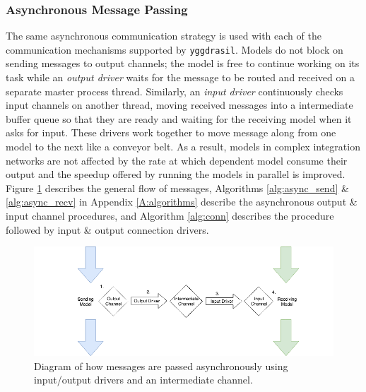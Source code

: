 \documentclass[journal]{IEEEtran}
\newcommand{\pkg}{{\tt yggdrasil}{}}
\newcommand{\A}{Appendix{ }}
\begin{document}
\subsubsection{Asynchronous Message Passing}\label{SSS:async}
%
The same asynchronous communication strategy is used with each of the communication mechanisms supported by {\pkg}. Models do not block on sending messages to output channels; the model is free to continue working on its task while an \emph{output driver} waits for the message to be routed and received on a separate master process thread. Similarly, an \emph{input driver} continuously checks input channels on another thread, moving received messages into a intermediate buffer queue so that they are ready and waiting for the receiving model when it asks for input. These drivers work together to move message along from one model to the next like a conveyor belt. As a result, models in complex integration networks are not affected by the rate at which dependent model consume their output and the speedup offered by running the models in parallel is improved. Figure \ref{fig:async} describes the general flow of messages, Algorithms \ref{alg:async_send} \& \ref{alg:async_recv} in \A\ref{A:algorithms} describe the asynchronous output \& input channel procedures, and Algorithm \ref{alg:conn} describes the procedure followed by input \& output connection drivers.
%
\ifinclfig
 	\begin{figure}[htbp]
	\begin{center}
	\includegraphics[width=\columnwidth,keepaspectratio]{./images/io_drivers.png}
	\caption{Diagram of how messages are passed asynchronously using input/output drivers and an intermediate channel.}
	\label{fig:async}
	\end{center}
	\end{figure}
\fi
%
\end{document}
